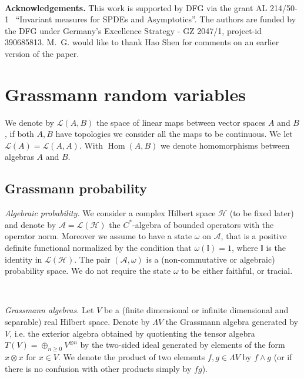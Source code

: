 \documentclass{article}
\newcommand{\tmop}[1]{\ensuremath{\operatorname{#1}}}
\newcommand{\tmtextbf}[1]{{\bfseries{#1}}}
\newcommand{\tmtextit}[1]{{\itshape{#1}}}
\begin{document}
\

{\noindent}\tmtextbf{Acknowledgements.} This work is supported by DFG via the
grant AL 214/50-1 \ ``Invariant measures for SPDEs and Asymptotics''. The
authors are funded by the DFG under Germany's Excellence Strategy - GZ 2047/1,
project-id 390685813. M.~G. would like to thank Hao Shen for comments on an
earlier version of the paper.

\section{Grassmann random variables}\label{sec:grassmann-rv}

We denote by $\mathcal{L} (A, B)$ the space of linear maps between vector
spaces $A$ and $B$, if both $A, B$ have topologies we consider all the maps to
be continuous. We let $\mathcal{L} (A) =\mathcal{L} (A, A)$. With $\tmop{Hom}
(A, B)$ we denote homomorphisms between algebras $A$ and $B$.

\subsection{Grassmann probability}\label{sec:prob}

\tmtextit{Algebraic probability.} We consider a complex Hilbert space
$\mathcal{H}$ (to be fixed later) and denote by $\mathcal{A}=\mathcal{L}
(\mathcal{H})$ the $C^{\ast}$-algebra of bounded operators with the operator
norm. Moreover we assume to have a state $\omega$ on $\mathcal{A}$, that is a
positive definite functional normalized by the condition that $\omega
(\mathbb{I}) = 1$, where $\mathbb{I}$ is the identity in $\mathcal{L}
(\mathcal{H})$. The pair $(\mathcal{A}, \omega)$ is a (non-commutative or
algebraic) probability space. We do not require the state $\omega$ to be
either faithful, or tracial.

\

\tmtextit{Grassmann algebras.} Let $V$ be a (finite dimensional or infinite
dimensional and separable) real Hilbert space. Denote by $\Lambda V$ the
Grassmann algebra generated by $V$, i.e. the exterior algebra obtained by
quotienting the tensor algebra $T (V) = \oplus_{n \geqslant 0} V^{\otimes n}$
by the two-sided ideal generated by elements of the form $x \otimes x$ for $x
\in V$. We denote the product of two elements $f, g \in \Lambda V$ by $f
\wedge g$ (or if there is no confusion with other products simply by $f g$).

\
\end{document}
